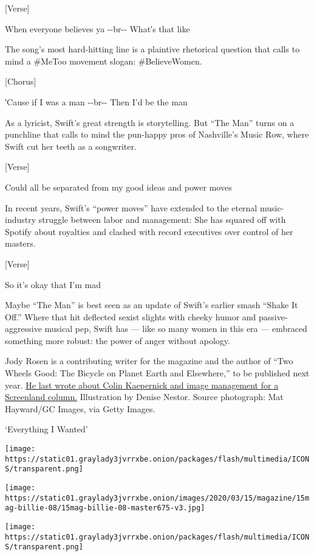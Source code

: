{[}Verse{]}

When everyone believes ya -\/-br-\/- What′s that like

The song's most hard-hitting line is a plaintive rhetorical question
that calls to mind a \#MeToo movement slogan: \#BelieveWomen.

{[}Chorus{]}

′Cause if I was a man -\/-br-\/- Then I'd be the man

As a lyricist, Swift's great strength is storytelling. But ``The Man''
turns on a punchline that calls to mind the pun-happy pros of
Nashville's Music Row, where Swift cut her teeth as a songwriter.

{[}Verse{]}

Could all be separated from my good ideas and power moves

In recent years, Swift's ``power moves'' have extended to the eternal
music-industry struggle between labor and management: She has squared
off with Spotify about royalties and clashed with record executives over
control of her masters.

{[}Verse{]}

So it's okay that I'm mad

Maybe ``The Man'' is best seen as an update of Swift's earlier smash
``Shake It Off.'' Where that hit deflected sexist slights with cheeky
humor and passive-aggressive musical pep, Swift has --- like so many
women in this era --- embraced something more robust: the power of anger
without apology.

Jody Rosen is a contributing writer for the magazine and the author of
``Two Wheels Good: The Bicycle on Planet Earth and Elsewhere,'' to be
published next year.
\href{https://www.nytimes3xbfgragh.onion/2019/12/12/magazine/colin-kaepernick-nfl-video.html}{He
last wrote about Colin Kaepernick and image management for a Screenland
column.} Illustration by Denise Nestor. Source photograph: Mat
Hayward/GC Images, via Getty Images.

`Everything I Wanted'

\texttt{[image: https://static01.graylady3jvrrxbe.onion/packages/flash/multimedia/ICONS/transparent.png]}

\texttt{[image: https://static01.graylady3jvrrxbe.onion/images/2020/03/15/magazine/15mag-billie-08/15mag-billie-08-master675-v3.jpg]}

\texttt{[image: https://static01.graylady3jvrrxbe.onion/packages/flash/multimedia/ICONS/transparent.png]}

